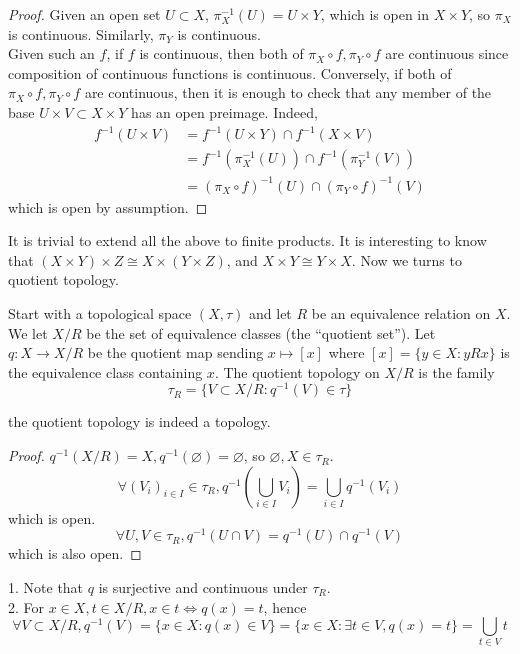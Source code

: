 \begin{proof}
    Given an open set $U\subset X$, $\pi_X^{-1}(U)=U\times Y$, which is open in $X\times Y$, so $\pi_X$ is continuous.
    Similarly, $\pi_Y$ is continuous.\\
    Given such an $f$, if $f$ is continuous, then both of $\pi_X\circ f,\pi_Y\circ f$ are continuous since composition of continuous functions is continuous.
    Conversely, if both of $\pi_X\circ f,\pi_Y\circ f$ are continuous, then it is enough to check that any member of the base $U\times V\subset X\times Y$ has an open preimage.
    Indeed,
    \begin{align*}
        f^{-1}(U\times V)&=f^{-1}(U\times Y)\cap f^{-1}(X\times V)\\
        &=f^{-1}(\pi_X^{-1}(U))\cap f^{-1}(\pi_Y^{-1}(V))\\
        &=(\pi_X\circ f)^{-1}(U)\cap (\pi_Y\circ f)^{-1}(V)
    \end{align*}
    which is open by assumption.
\end{proof}
It is trivial to extend all the above to finite products.
It is interesting to know that $(X\times Y)\times Z\cong X\times (Y\times Z)$, and $X\times Y\cong Y\times X$.
Now we turns to quotient topology.
\begin{definition}
    Start with a topological space $(X,\tau)$ and let $R$ be an equivalence relation on $X$.
    We let $X/R$ be the set of equivalence classes (the ``quotient set'').
    Let $q:X\to X/R$ be the quotient map sending $x\mapsto [x]$ where $[x]=\{y\in X:yRx\}$ is the equivalence class containing $x$.
    The quotient topology on $X/R$ is the family
    $$\tau_R=\{V\subset X/R:q^{-1}(V)\in\tau\}$$
\end{definition}
\begin{proposition}
    the quotient topology is indeed a topology.
\end{proposition}
\begin{proof}
    $q^{-1}(X/R)=X,q^{-1}(\varnothing)=\varnothing$, so $\varnothing,X\in\tau_R$.
    $$\forall (V_i)_{i\in I}\in\tau_R,q^{-1}\left(\bigcup_{i\in I}V_i\right)=\bigcup_{i\in I}q^{-1}(V_i)$$
    which is open.
    $$\forall U,V\in\tau_R,q^{-1}(U\cap V)=q^{-1}(U)\cap q^{-1}(V)$$
    which is also open.
\end{proof}
\begin{remark}
    1. Note that $q$ is surjective and continuous under $\tau_R$.\\
    2. For $x\in X,t\in X/R, x\in t\iff q(x)=t$, hence
    $$\forall V\subset X/R,q^{-1}(V)=\{x\in X:q(x)\in V\}=\{x\in X:\exists t\in V, q(x)=t\}=\bigcup_{t\in V}t$$
\end{remark}
